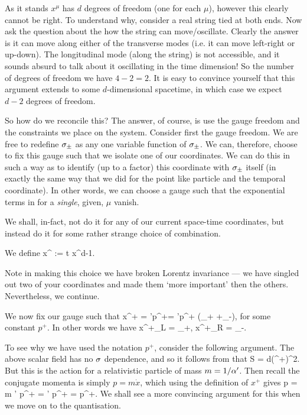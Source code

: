 As it stands $x^{\mu}$ has $d$ degrees of freedom (one for each $\mu$), however this clearly cannot be right. To understand why, consider a real string tied at both ends. Now ask the question about the how the string can move/oscillate. Clearly the answer is it can move along either of the transverse modes (i.e. it can move left-right or up-down). The longitudinal mode (along the string) is not accessible, and it sounds absurd to talk about it oscillating in the time dimension! So the number of degrees of freedom we have $4-2=2$. It is easy to convince yourself that this argument extends to some $d$-dimensional spacetime, in which case we expect $d-2$ degrees of freedom. 

So how do we reconcile this? The answer, of course, is use the gauge freedom and the constraints we place on the system. Consider first the gauge freedom. We are free to redefine $\sigma_{\pm}$ as any one variable function of $\sigma_{\pm}$. We can, therefore, choose to fix this gauge such that we isolate one of our coordinates. We can do this in such a way as to identify (up to a factor) this coordinate with $\sigma_{\pm}$ itself (in exactly the same way that we did for the point like particle and the temporal coordinate). In other words, we can choose a gauge such that the exponential terms in  for a \textit{single}, given, $\mu$ vanish. 

We shall, in-fact, not do it for any of our current space-time coordinates, but instead do it for some rather strange choice of combination. 

\bd 
We define 
\be 
\label{eqn:xpm}
    x^{\pm} := t \pm x^{d-1}.
\ee 
\ed 

\br 
Note in making this choice we have broken Lorentz invariance --- we have singled out two of your coordinates and made them `more important' then the others. Nevertheless, we continue.
\er 

We now fix our gauge such that 
\be 
\label{eqn:xplus}
    x^+ = \a'p^+\tau = \a'p^+ (\sig_+ +\sig_-),
\ee 
for some constant $p^+$. In other words we have 
\be 
\label{eqn:xplusLR}
    x^+_L =  \sig_+, \qquad {} \qquad x^+_R = \sig_-.
\ee 

\br 
To see why we have used the notation $p^+$, consider the following argument. The above scalar field has no $\sigma$ dependence, and so it follows from  that 
\bse 
    S =  \int d\tau (^+)^2.
\ese
But this is the action for a relativistic particle of mass $m=1/\alpha'$. Then recall the conjugate momenta is simply $p=m\dot{x}$, which using the definition of $x^+$ gives
\bse 
    p = m \a' p^+ =  \a' p^+ = p^+.
\ese 
We shall see a more convincing argument for this when we move on to the quantisation. 
\er 

